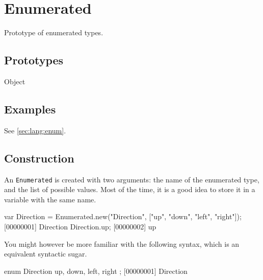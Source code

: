 
\section{Enumerated}

Prototype of enumerated types.

\subsection{Prototypes}
\begin{refObjects}
\item[Object]
\end{refObjects}

\subsection{Examples}

See \autoref{sec:lang:enum}.

\subsection{Construction}
\label{sec:stdlib:event:ctor}

An \lstinline{Enumerated} is created with two arguments: the name of the
enumerated type, and the list of possible values. Most of the time, it is a
good idea to store it in a variable with the same name.

\begin{urbiscript}[firstnumber=1]
var Direction = Enumerated.new("Direction", ["up", "down", "left", "right"]);
[00000001] Direction
Direction.up;
[00000002] up
\end{urbiscript}

You might however be more familiar with the following syntax, which is an
equivalent syntactic sugar.

\begin{urbiunchecked}
enum Direction
{
  up,
  down,
  left,
  right
};
[00000001] Direction
\end{urbiunchecked}

